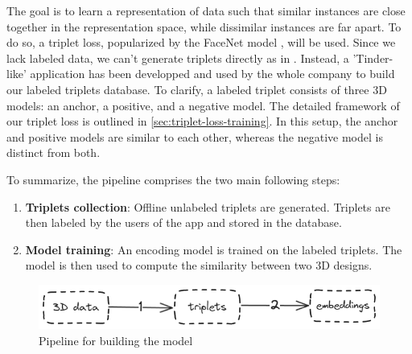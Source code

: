 The goal is to learn a representation of data such that similar instances are close together in the representation space, while dissimilar instances are far apart. To do so, a triplet loss, popularized by the FaceNet model \cite{schroffFaceNetUnifiedEmbedding2015}, will be used. Since we lack labeled data, we can't generate triplets directly as in \cite{schroffFaceNetUnifiedEmbedding2015}. Instead, a 'Tinder-like' application has been developped and used by the whole company to build our labeled triplets database. To clarify, a labeled triplet consists of three 3D models: an anchor, a positive, and a negative model. The detailed framework of our triplet loss is outlined in \autoref{sec:triplet-loss-training}. In this setup, the anchor and positive models are similar to each other, whereas the negative model is distinct from both.

To summarize, the pipeline comprises the two main following steps:
\begin{enumerate}
    \item \textbf{Triplets collection}: Offline unlabeled triplets are generated. Triplets are then labeled by the users of the app and stored in the database.
    \item \textbf{Model training}: An encoding model is trained on the labeled triplets. The model is then used to compute the similarity between two 3D designs.
\end{enumerate}

\begin{figure}[]
    \centering
    \includegraphics[width=0.8\columnwidth]{images/steps.png}
    \caption{Pipeline for building the model}   
    \label{fig:steps}
\end{figure}